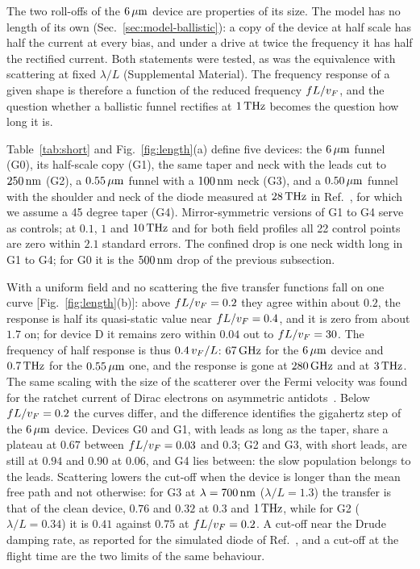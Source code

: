The two roll-offs of the $6\,\mu\mathrm{m}$ device are properties of its size. The
model has no length of its own (Sec.~\ref{sec:model-ballistic}): a copy of
the device at half scale has half the current at every bias, and under a
drive at twice the frequency it has half the rectified current. Both
statements were tested, as was the equivalence with scattering at fixed
$\lambda/L$ (Supplemental Material). The
frequency response of a given shape is therefore a function of the reduced
frequency $fL/v_{F}$, and the question whether a ballistic funnel rectifies
at $1\,\mathrm{THz}$ becomes the question how long it is.

Table~\ref{tab:short} and Fig.~\ref{fig:length}(a) define five devices: the
$6\,\mu\mathrm{m}$ funnel (G0), its half-scale copy (G1), the same taper and neck with
the leads cut to $250\,\mathrm{nm}$ (G2), a $0.55\,\mu\mathrm{m}$ funnel with a $100\,\mathrm{nm}$ neck
(G3), and a $0.50\,\mu\mathrm{m}$ funnel with the shoulder and neck of the diode
measured at $28\,\mathrm{THz}$ in Ref.~\cite{zhu2013graphene}, for which we assume a
45 degree taper (G4). Mirror-symmetric versions of G1 to G4 serve as
controls; at $0.1$, $1$ and $10\,\mathrm{THz}$ and for both field profiles all 22
control points are zero within $2.1$ standard errors. The confined drop is
one neck width long in G1 to G4; for G0 it is the $500\,\mathrm{nm}$ drop of the
previous subsection.

With a uniform field and no scattering the five transfer functions fall on
one curve [Fig.~\ref{fig:length}(b)]: above $fL/v_{F}=0.2$ they agree within
about $0.2$, the response is half its quasi-static value near
$fL/v_{F}=0.4$, and it is zero from about $1.7$ on; for device D it remains
zero within $0.04$ out to $fL/v_{F}=30$. The frequency of half response is
thus $0.4\,v_{F}/L$: $67\,\mathrm{GHz}$ for the $6\,\mu\mathrm{m}$ device and $0.7\,\mathrm{THz}$ for the
$0.55\,\mu\mathrm{m}$ one, and the response is gone at $280\,\mathrm{GHz}$ and at $3\,\mathrm{THz}$. The
same scaling with the size of the scatterer over the Fermi velocity was
found for the ratchet current of Dirac electrons on asymmetric
antidots~\cite{ermann2011relativistic}. Below $fL/v_{F}=0.2$ the curves
differ, and the difference identifies the gigahertz step of the $6\,\mu\mathrm{m}$
device. Devices G0 and G1, with leads as long as the taper, share a
plateau at $0.67$ between $fL/v_{F}=0.03$ and $0.3$; G2 and G3, with short
leads, are still at $0.94$ and $0.90$ at $0.06$, and G4 lies between: the slow population
belongs to the leads. Scattering
lowers the cut-off when the device is longer than the mean free path and
not otherwise: for G3 at $\lambda=700\,\mathrm{nm}$ ($\lambda/L=1.3$) the transfer
is that of the clean device, $0.76$ and $0.32$ at $0.3$ and $1\,\mathrm{THz}$,
while for G2 ($\lambda/L=0.34$) it is $0.41$ against $0.75$ at
$fL/v_{F}=0.2$. A cut-off near the Drude damping rate, as reported for the
simulated diode of Ref.~\cite{stearns2020high}, and a cut-off at the
flight time are the two limits of the same behaviour.

